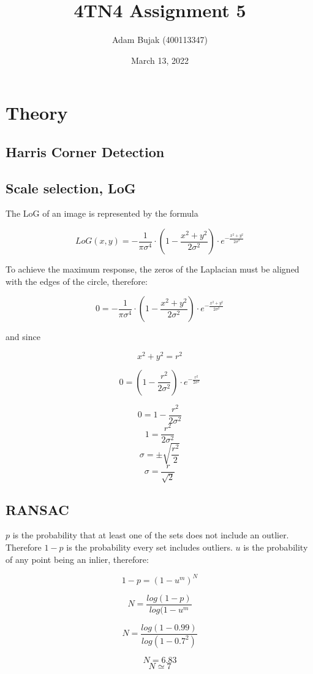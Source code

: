 \documentclass[12pt, letterpaper]{article}
\title{4TN4 Assignment 5}
\author{Adam Bujak (400113347)}
\date{March 13, 2022}
\begin{document}
\maketitle

\section{Theory}

\subsection{Harris Corner Detection}

\subsection{Scale selection, LoG}

The LoG of an image is represented by the formula 

\[LoG(x,y) = - \frac{1}{\pi\sigma^4}\cdot (1-\frac{x^2 + y^2}{2\sigma^2})\cdot e^{-\frac{x^2+y^2}{2\sigma^2}}\]

To achieve the maximum response, the zeros of the Laplacian must be aligned with the edges of the circle, therefore:

\[0 = - \frac{1}{\pi\sigma^4}\cdot (1-\frac{x^2 + y^2}{2\sigma^2})\cdot e^{-\frac{x^2+y^2}{2\sigma^2}}\]

and since 

\[x^2 + y^2 = r^2\]


\[0 = (1-\frac{r^2}{2\sigma^2})\cdot e^{-\frac{r^2}{2\sigma^2}}\]

\[0 = 1-\frac{r^2}{2\sigma^2}\]
\[1 = \frac{r^2}{2\sigma^2}\]
\[\sigma = \pm\sqrt{\frac{r^2}{2}}\]
\[\sigma = \frac{r}{\sqrt{2}}\]

\subsection{RANSAC}

$p$ is the probability that at least one of the sets does not include an outlier. Therefore $1-p$ is the probability every set includes outliers. $u$ is the probability of any point being an inlier, therefore:

\[1-p = (1-u^m)^N\]

\[N = \frac{log(1-p)}{log(1-u^m} \]

\[N = \frac{log(1-0.99)}{log(1-0.7^2)} \]

\[N = 6.83 \]
\[N \simeq 7 \]
\end{document}
